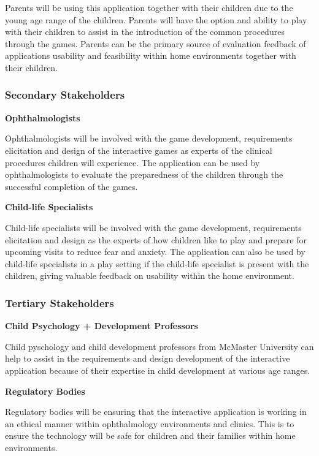 \documentclass{article}
\begin{document}
        Parents will be using this application together with their children due to the 
        young age range of the children. Parents will have the option and ability to 
        play with their children to assist in the introduction of the common 
        procedures through the games. Parents can be the primary source of evaluation 
        feedback of applications usability and feasibility within home environments 
        together with their children.

    \subsubsection{Secondary Stakeholders}
        \textbf{Ophthalmologists}

        Ophthalmologists will be involved with the game development, requirements 
        elicitation and design of the interactive games as experts of the clinical 
        procedures children will experience. The application can be used by 
        ophthalmologists to evaluate the preparedness of the children through the 
        successful completion of the games. 

        \textbf{Child-life Specialists}

        Child-life specialists will be involved with the game development, 
        requirements elicitation and design as the experts of how children like to 
        play and prepare for upcoming visits to reduce fear and anxiety. The 
        application can also be used by child-life specialists in a play setting 
        if the child-life specialist is present with the children, giving valuable 
        feedback on usability within the home environment.

    \subsubsection{Tertiary Stakeholders}

        \textbf{Child Psychology + Development Professors}

        Child pyschology and child development professors from McMaster University 
        can help to assist in the requirements and design development of the interactive 
        application because of their expertise in child development at various age ranges.

        \textbf{Regulatory Bodies}
        
        Regulatory bodies will be ensuring that the interactive application is working in 
        an ethical manner within ophthalmology environments and clinics. This is to ensure 
        the technology will be safe for children and their families within home environments.
\end{document}
